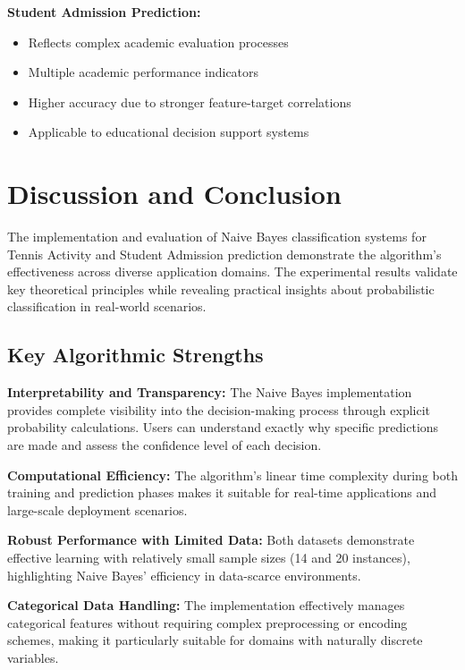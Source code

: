 \documentclass[11pt,a4paper]{article}
\begin{document}
\textbf{Student Admission Prediction:}
\begin{itemize}
    \item Reflects complex academic evaluation processes
    \item Multiple academic performance indicators
    \item Higher accuracy due to stronger feature-target correlations
    \item Applicable to educational decision support systems
\end{itemize}

\section{Discussion and Conclusion}

The implementation and evaluation of Naive Bayes classification systems for Tennis Activity and Student Admission prediction demonstrate the algorithm's effectiveness across diverse application domains. The experimental results validate key theoretical principles while revealing practical insights about probabilistic classification in real-world scenarios.

\subsection{Key Algorithmic Strengths}

\textbf{Interpretability and Transparency:} The Naive Bayes implementation provides complete visibility into the decision-making process through explicit probability calculations. Users can understand exactly why specific predictions are made and assess the confidence level of each decision.

\textbf{Computational Efficiency:} The algorithm's linear time complexity during both training and prediction phases makes it suitable for real-time applications and large-scale deployment scenarios.

\textbf{Robust Performance with Limited Data:} Both datasets demonstrate effective learning with relatively small sample sizes (14 and 20 instances), highlighting Naive Bayes' efficiency in data-scarce environments.

\textbf{Categorical Data Handling:} The implementation effectively manages categorical features without requiring complex preprocessing or encoding schemes, making it particularly suitable for domains with naturally discrete variables.
\end{document}

